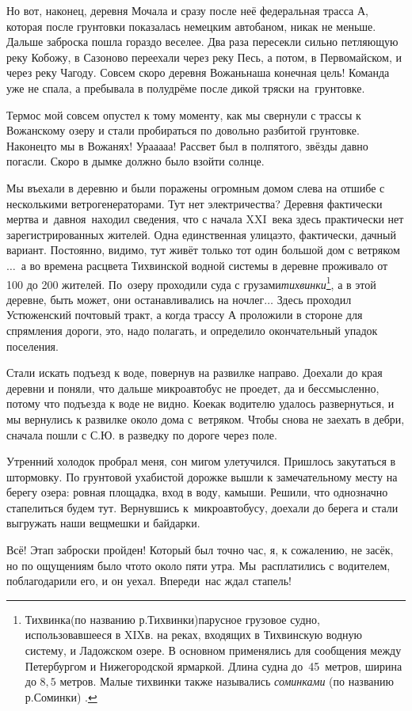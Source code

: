 Но вот, наконец, деревня Мочала и сразу после неё федеральная трасса А, которая после грунтовки показалась немецким автобаном, никак не меньше. Дальше заброска пошла гораздо веселее. Два раза пересекли сильно петляющую реку Кобожу, в Сазоново переехали через реку Песь, а потом, в Первомайском, и через реку Чагоду. Совсем скоро деревня Вожань\mdash наша конечная цель! Команда уже не спала, а пребывала в полудрёме после дикой тряски на~грунтовке.

\newpage
Термос мой совсем опустел к тому моменту, как мы свернули с трассы к Вожанскому озеру и стали пробираться по довольно разбитой грунтовке. Наконец\sdash то мы в Вожанях! Ура\sdash а\sdash а\sdash а\sdash а! Рассвет был в полпятого, звёзды давно погасли. Скоро в дымке должно было взойти солнце. 

\renewcommand*{\thefootnote}{\fnsymbol{footnote}}
Мы въехали в деревню и были поражены огромным домом слева на отшибе с несколькими ветрогенераторами. Тут нет электричества? Деревня фактически мертва и~давно\mdash я~находил сведения, что с начала XXI~века здесь практически нет зарегистрированных жителей. Одна единственная улица\mdash это, фактически, дачный вариант. Постоянно, видимо, тут живёт только тот один большой дом с ветряком$\ldots$~а во времена расцвета Тихвинской водной системы в деревне проживало от 100 до 200 жителей. По~озеру проходили суда с грузами\mdash \textit{тихвинки}\footnote[1]{Тихвинка\thinspace(по названию р.\thinspace Тихвинки)\mdash парусное грузовое судно, использовавшееся в XIX\thinspace в. на реках, входящих в Тихвинскую водную систему, и Ладожском озере. В основном применялись для сообщения между Петербургом и Нижегородской ярмаркой. Длина судна до~45~метров, ширина до $8,5$ метров. Малые тихвинки также назывались \textit{соминками} (по названию р.\thinspace Соминки) \cite{МорскойСправочник}.}, а в этой деревне, быть может, они останавливались на ночлег$\ldots$ Здесь проходил Устюженский почтовый тракт, а когда трассу А проложили в стороне для спрямления дороги, это, надо полагать, и определило окончательный упадок поселения.

Стали искать подъезд к воде, повернув на развилке направо. Доехали до края деревни и поняли, что дальше микроавтобус не проедет, да и бессмысленно, потому что подъезда к воде не видно. Кое\sdash как водителю удалось развернуться, и мы вернулись к развилке около дома с~ветряком. Чтобы снова не заехать в дебри, сначала пошли с С.Ю. в разведку по дороге через поле. 

Утренний холодок пробрал меня, сон мигом улетучился. Пришлось закутаться в штормовку. По грунтовой ухабистой дорожке вышли к замечательному месту на берегу озера: ровная площадка, вход в воду, камыши. Решили, что однозначно стапелиться будем тут. Вернувшись к~микроавтобусу, доехали до берега и стали выгружать наши вещмешки и байдарки. 

Всё! Этап заброски пройден! Который был точно час, я, к сожалению, не засёк, но по ощущениям было что\sdash то около пяти утра. Мы~расплатились с водителем, поблагодарили его, и он уехал. Впереди~нас ждал стапель!

\begin{center}
\end{center}
